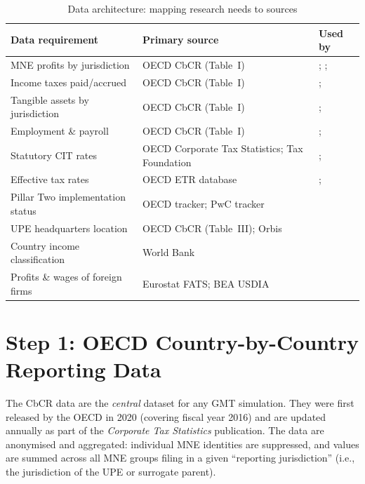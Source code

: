 \documentclass[12pt,a4paper]{article}
\begin{document}
\begin{table}[!ht]
\centering
\caption{Data architecture: mapping research needs to sources}
\label{tab:architecture}
\small
\begin{tabular}{p{4cm}p{4.5cm}p{4cm}}
\toprule
\textbf{Data requirement} & \textbf{Primary source} & \textbf{Used by} \\
\midrule
MNE profits by jurisdiction & OECD CbCR (Table~I) & \textcite{barake2022}; \textcite{hugger2025}; \textcite{garcia2024} \\
\addlinespace
Income taxes paid/accrued & OECD CbCR (Table~I) & \textcite{barake2022}; \textcite{hugger2025} \\
\addlinespace
Tangible assets by jurisdiction & OECD CbCR (Table~I) & \textcite{devereux2023}; \textcite{barake2022} \\
\addlinespace
Employment \& payroll & OECD CbCR (Table~I) & \textcite{devereux2023}; \textcite{schjelderup2024} \\
\addlinespace
Statutory CIT rates & OECD Corporate Tax Statistics; Tax Foundation & \textcite{barake2022}; \textcite{torslov2022} \\
\addlinespace
Effective tax rates & OECD ETR database & \textcite{devereux2023}; \textcite{hugger2025} \\
\addlinespace
Pillar Two implementation status & OECD tracker; PwC tracker & \textcite{bilicka2023} \\
\addlinespace
UPE headquarters location & OECD CbCR (Table~III); Orbis & \textcite{barake2022} \\
\addlinespace
Country income classification & World Bank & \textcite{garcia2024} \\
\addlinespace
Profits \& wages of foreign firms & Eurostat FATS; BEA USDIA & \textcite{torslov2022} \\
\bottomrule
\end{tabular}
\end{table}


\section{Step 1: OECD Country-by-Country Reporting Data}\label{sec:cbcr}

The CbCR data are the \emph{central} dataset for any GMT simulation.
They were first released by the OECD in 2020 (covering fiscal year 2016) and are updated annually as part of the \emph{Corporate Tax Statistics} publication.
The data are anonymised and aggregated: individual MNE identities are suppressed, and values are summed across all MNE groups filing in a given ``reporting jurisdiction'' (i.e., the jurisdiction of the UPE or surrogate parent).
\end{document}

